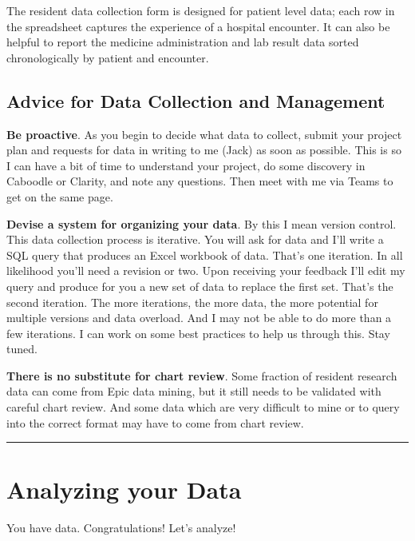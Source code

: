\documentclass[
]{report}
\begin{document}
The resident data collection form is designed for patient level data;
each row in the spreadsheet captures the experience of a hospital
encounter. It can also be helpful to report the medicine administration
and lab result data sorted chronologically by patient and encounter.

\hypertarget{advice-for-data-collection-and-management}{%
\section{Advice for Data Collection and
Management}\label{advice-for-data-collection-and-management}}

\textbf{Be proactive}. As you begin to decide what data to collect,
submit your project plan and requests for data in writing to me (Jack)
as soon as possible. This is so I can have a bit of time to understand
your project, do some discovery in Caboodle or Clarity, and note any
questions. Then meet with me via Teams to get on the same page.

\textbf{Devise a system for organizing your data}. By this I mean
version control. This data collection process is iterative. You will ask
for data and I'll write a SQL query that produces an Excel workbook of
data. That's one iteration. In all likelihood you'll need a revision or
two. Upon receiving your feedback I'll edit my query and produce for you
a new set of data to replace the first set. That's the second iteration.
The more iterations, the more data, the more potential for multiple
versions and data overload. And I may not be able to do more than a few
iterations. I can work on some best practices to help us through this.
Stay tuned.

\textbf{There is no substitute for chart review}. Some fraction of
resident research data can come from Epic data mining, but it still
needs to be validated with careful chart review. And some data which are
very difficult to mine or to query into the correct format may have to
come from chart review.

\begin{center}\rule{0.5\linewidth}{0.5pt}\end{center}

\hypertarget{analyzing-your-data}{%
\chapter{Analyzing your Data}\label{analyzing-your-data}}

You have data. Congratulations! Let's analyze!
\end{document}
